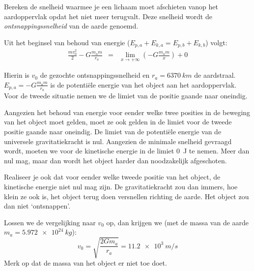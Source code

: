 \documentclass{ximera}
\begin{document}
\begin{exercise}
Bereken de snelheid waarmee je een lichaam moet afschieten vanop het aardoppervlak opdat het niet meer terugvalt. Deze snelheid wordt de \emph{ontsnappingssnelheid} van de aarde genoemd.

\begin{oplossing}
Uit het beginsel van behoud van energie ($E_{p,a}+E_{k,a}=E_{p,b}+E_{k,b}$) volgt:
\begin{eqnarray*}
\frac{mv_0^2}{2}-G\frac{m_am}{r_a}&=&\lim_{x\rightarrow+\infty}\left(-G\frac{m_am}{x}\right)+0
\end{eqnarray*}

Hierin is $v_0$ de gezochte ontsnappingssnelheid en $r_a=\SI{6370}{km}$ de aardstraal. $E_{p,a}=-G\frac{m_am}{r_a}$ is de potentiële energie van het object aan het aardoppervlak. Voor de tweede situatie nemen we de limiet van de positie gaande naar oneindig.

Aangezien het behoud van energie voor eender welke twee posities in de beweging van het object moet gelden, moet ze ook gelden in de limiet voor de tweede positie gaande naar oneindig. De limiet van de potentiële energie van de universele gravitatiekracht is nul. Aangezien de minimale snelheid gevraagd wordt, moeten we voor de kinetische energie in de limiet \SI{0}{J} te nemen. Meer dan nul mag, maar dan wordt het object harder dan noodzakelijk afgeschoten.

Realiseer je ook dat voor eender welke tweede positie van het object, de kinetische energie niet nul mag zijn. De gravitatiekracht zou dan immers, hoe klein ze ook is, het object terug doen versnellen richting de aarde. Het object zou dan niet `ontsnappen'.

Lossen we de vergelijking naar $v_0$ op, dan krijgen we (met de massa van de aarde $m_a=\SI{5,972e24}{kg}$):
\begin{equation*}
	v_0=\sqrt{\frac{2Gm_a}{r_a}}=\SI{11,2e3}{m/s}
\end{equation*}
Merk op dat de massa van het object er niet toe doet.
\end{oplossing}
\end{exercise}
\end{document}

